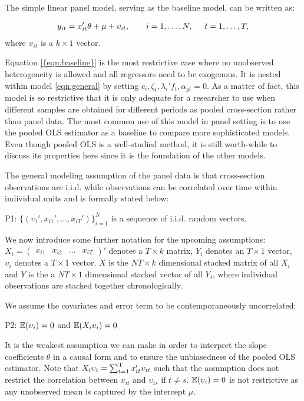 The simple linear panel model, serving as the baseline model, can be written as:

\begin{align}\label{{eqn:baseline}}
    y_{it} = x_{it}'\theta + \mu + \upsilon_{it},  \hspace{0.7cm} i=1, \dots, N, \hspace{0.5cm} t = 1, \dots, T,
\end{align}
where $x_{it}$ is a $ k \times 1 $ vector.

Equation \eqref{{eqn:baseline}} is the most restrictive case where no unobserved heterogeneity is allowed and all regressors need to be exogenous. It is nested within model \eqref{eqn:general} by setting $c_i, \zeta_t, \lambda_i' f_t, \alpha_{gt} = 0$.  As a matter of fact, this model is so restrictive that it is only adequate for a researcher to use when different samples are obtained for different periods as pooled cross-section rather than panel data. The most common use of this model in panel setting is to use the pooled OLS estimator as a baseline to compare more sophisticated models. Even though pooled OLS is a well-studied method, it is still worth-while to discuss its properties here since it is the foundation of the other models.

The general modeling assumption of the panel data is that cross-section observations are i.i.d. while observations can be correlated over time within individual units and is formally stated below: 
\begin{assumption}
P1:  $\{(\upsilon_i',x_{i1}',..., x_{iT}')\}_{i=1}^N$ is a sequence of i.i.d. random vectors.
\end{assumption} 

We now introduce some further notation for the upcoming assumptions: $X_i= \begin{pmatrix} x_{i1} & x_{i2} & \hdots & x_{iT} \end{pmatrix}'$ denotes a $ T \times k $ matrix, $Y_i$ denotes an $ T \times 1 $ vector, $\upsilon_i$ denotes a $ T \times 1 $ vector. $X$ is the $NT \times k$ dimensional stacked matrix of all $X_i$ and $Y$ is the a $NT \times 1 $ dimensional stacked vector of all $Y_i$, where individual observations are stacked together chronologically.

We assume the covariates and error term to be contemporaneously uncorrelated:
\begin{assumption}
P2:  $\operatorname{\mathbb{E}}(\upsilon_i)=0$ and $\operatorname{\mathbb{E}}(X_i \upsilon_i ) = 0 $
\end{assumption} 
It is the weakest assumption we can make in order to interpret the slope coefficients $\theta$ in a causal form and to ensure the unbiasedness of the pooled OLS estimator. Note that $X_i \upsilon_i = \operatorname*{\sum_{t=1}^T} x_{it}'\upsilon_{it}$ such that the assumption does not restrict the correlation between $x_{it}$ and $\upsilon_{is}$ if $ t \neq s $. $\operatorname{\mathbb{E}}(\upsilon_i)=0$ is not restrictive as any unobserved mean is captured by the intercept $\mu$.

